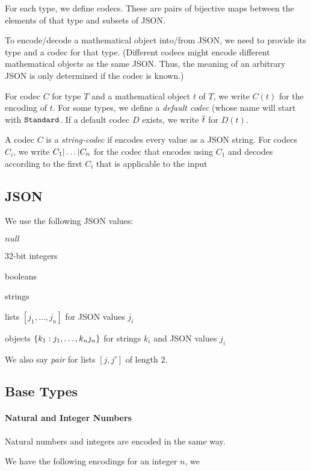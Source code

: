 For each type, we define codecs. These are pairs of bijective maps between the elements of that type and subsets of JSON.

To encode/decode a mathematical object into/from JSON, we need to provide its type and a codec for that type.
(Different codecs might encode different mathematical objects as the same JSON. Thus, the meaning of an arbitrary JSON is only determined if the codec is known.)

For codec $C$ for type $T$ and a mathematical object $t$ of $T$, we write $C(t)$ for the encoding of $t$.
For some types, we define a \emph{default codec} (whose name will start with $\cn{Standard}$.
If a default codec $D$ exists, we write $\ov{t}$ for $D(t)$.

A codec $C$ is a \emph{string-codec} if encodes every value as a JSON string.
For codecs $C_i$, we write $\cunion{C_1,\ldots,C_n}$ for the codec that encodes using $C_1$ and decodes according to the first $C_i$ that is applicable to the input

\subsection{JSON}

We use the following JSON values:
\begin{compactitem}
  \item $null$
  \item 32-bit integers
  \item booleans
  \item strings
  \item lists $[j_1,\ldots,j_n]$ for JSON values $j_i$
  \item objects $\jobj{k_1:j_1,\ldots,k_nj_n}$ for strings $k_i$ and JSON values $j_i$
\end{compactitem}
We also say \emph{pair} for lists $[j,j']$ of length $2$.

\subsection{Base Types}

\paragraph{Natural and Integer Numbers}
Natural numbers and integers are encoded in the same way.

We have the following encodings for an integer $n$, we

